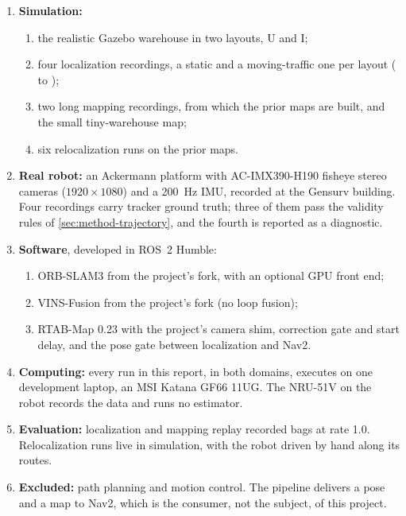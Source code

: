 \begin{enumerate}[leftmargin=2em]
  \item \textbf{Simulation:}
    \begin{enumerate}[label=(\alph*)]
      \item the realistic Gazebo warehouse in two layouts, U and I;
      \item four localization recordings, a static and a moving-traffic one per
        layout ( to );
      \item two long mapping recordings, from which the prior maps are built, and
        the small tiny-warehouse map;
      \item six relocalization runs on the prior maps.
    \end{enumerate}
  \item \textbf{Real robot:} an Ackermann platform with AC-IMX390-H190 fisheye
    stereo cameras ($1920\times1080$) and a \SI{200}{\hertz} IMU, recorded at the
    Gensurv building. Four recordings carry tracker ground truth; three of them
    pass the validity rules of \cref{sec:method-trajectory}, and the fourth is reported
    as a diagnostic.
  \item \textbf{Software}, developed in ROS~2 Humble:
    \begin{enumerate}[label=(\alph*)]
      \item ORB-SLAM3 from the project's fork, with an optional GPU front end;
      \item VINS-Fusion from the project's fork (no loop fusion);
      \item RTAB-Map 0.23 with the project's camera shim, correction gate and start
        delay, and the pose gate between localization and Nav2.
    \end{enumerate}
  \item \textbf{Computing:} every run in this report, in both domains, executes on
    one development laptop, an MSI Katana GF66 11UG. The NRU-51V on the robot
    records the data and runs no estimator.
  \item \textbf{Evaluation:} localization and mapping replay recorded bags at rate
    1.0. Relocalization runs live in simulation, with the robot driven by hand
    along its routes.
  \item \textbf{Excluded:} path planning and motion control. The pipeline
    delivers a pose and a map to Nav2, which is the consumer, not the subject,
    of this project.
\end{enumerate}

